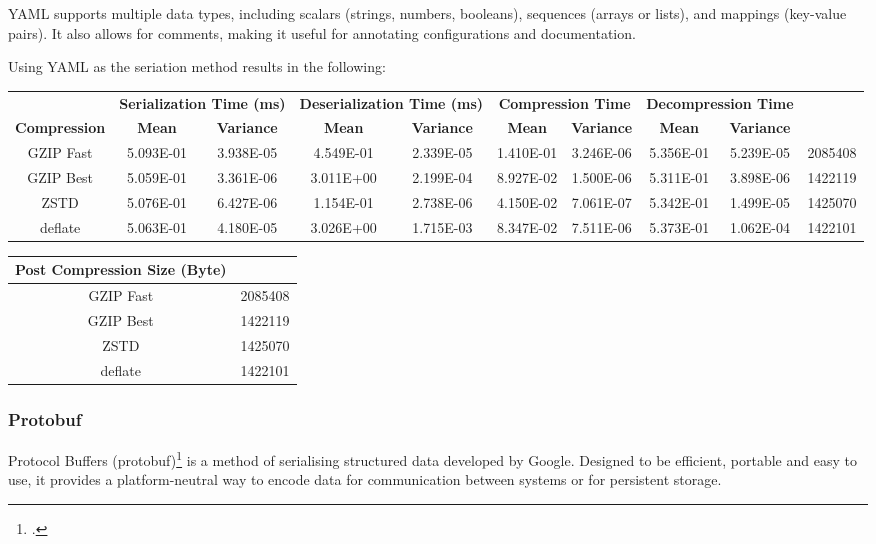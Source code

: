 YAML supports multiple data types, including scalars (strings, numbers, booleans), sequences (arrays or lists), and mappings (key-value pairs). It also allows for comments, making it useful for annotating configurations and documentation.

Using YAML as the seriation method results in the following:

\begin{table}[H]
\scriptsize
\centering
\begin{tabular}{cccccccccc}
\hline
 &
  \multicolumn{2}{c}{\textbf{Serialization Time (ms)}} &
  \multicolumn{2}{c}{\textbf{Deserialization Time (ms)}} &
  \multicolumn{2}{c}{\textbf{Compression Time}} &
  \multicolumn{2}{c}{\textbf{Decompression Time}} &
   \\
\textbf{Compression} & \textbf{Mean}     & \textbf{Variance} & \textbf{Mean}     & \textbf{Variance} & \textbf{Mean}     & \textbf{Variance} & \textbf{Mean}     & \textbf{Variance} \\
\hline
GZIP Fast           & 5.093E-01 & 3.938E-05 & 4.549E-01 & 2.339E-05 & 1.410E-01 & 3.246E-06 & 5.356E-01 & 5.239E-05 & 2085408 \\
GZIP Best           & 5.059E-01 & 3.361E-06 & 3.011E+00 & 2.199E-04 & 8.927E-02 & 1.500E-06 & 5.311E-01 & 3.898E-06 & 1422119 \\
ZSTD                & 5.076E-01 & 6.427E-06 & 1.154E-01 & 2.738E-06 & 4.150E-02 & 7.061E-07 & 5.342E-01 & 1.499E-05 & 1425070 \\
deflate             & 5.063E-01 & 4.180E-05 & 3.026E+00 & 1.715E-03 & 8.347E-02 & 7.511E-06 & 5.373E-01 & 1.062E-04 & 1422101 \\
\hline
\end{tabular}
\end{table}

\begin{table}[H]
  \scriptsize
  \centering
  \begin{tabular}{cc}
  \hline
  \textbf{Post Compression Size (Byte)} \\
  \hline
  GZIP Fast           & 2085408 \\
  GZIP Best           & 1422119 \\
  ZSTD                & 1425070 \\
  deflate             & 1422101 \\
  \hline
  \end{tabular}
  \end{table}

\subsubsection{Protobuf}
Protocol Buffers (protobuf)\footcite{protobuf} is a method of serialising structured data developed by Google. Designed to be efficient, portable and easy to use, it provides a platform-neutral way to encode data for communication between systems or for persistent storage.

